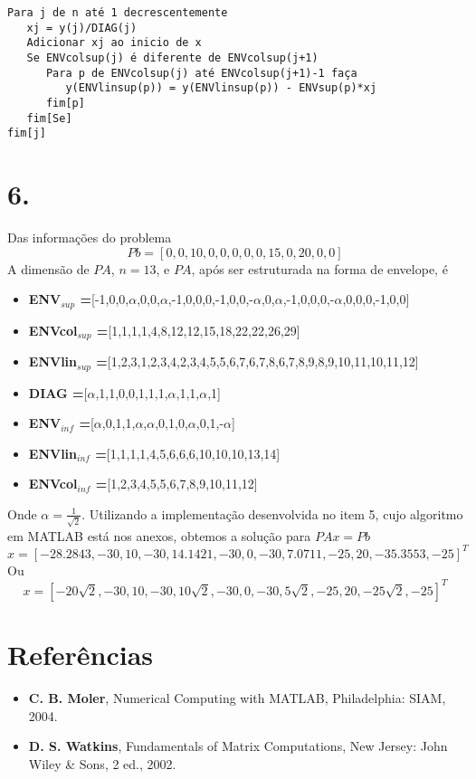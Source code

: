 \documentclass[a4paper, 12pt]{article}
\newcommand\litem[1]{\item{\bfseries #1}}
\begin{document}
\begin{verbatim}
Para j de n até 1 decrescentemente
   xj = y(j)/DIAG(j)
   Adicionar xj ao inicio de x
   Se ENVcolsup(j) é diferente de ENVcolsup(j+1)
      Para p de ENVcolsup(j) até ENVcolsup(j+1)-1 faça
         y(ENVlinsup(p)) = y(ENVlinsup(p)) - ENVsup(p)*xj
      fim[p]
   fim[Se]
fim[j]
\end{verbatim}

\section{6.}
Das informações do problema
\[
Pb =[0,0,10,0,0,0,0,0,15,0,20,0,0]
\]
A dimensão de $PA$, $n=13$, e $PA$, após ser estruturada na forma de envelope, é
\begin{itemize}[label=\textbullet]
\litem{ENV$_{sup}$ =}[-1,0,0,$\alpha$,0,0,$\alpha$,-1,0,0,0,-1,0,0,-$\alpha$,0,$\alpha$,-1,0,0,0,-$\alpha$,0,0,0,-1,0,0]
\litem{ENVcol$_{sup}$ =}[1,1,1,1,4,8,12,12,15,18,22,22,26,29]
\litem{ENVlin$_{sup}$ =}[1,2,3,1,2,3,4,2,3,4,5,5,6,7,6,7,8,6,7,8,9,8,9,10,11,10,11,12]
\litem{DIAG =}[$\alpha$,1,1,0,0,1,1,1,$\alpha$,1,1,$\alpha$,1]
\litem{ENV$_{inf}$ =}[$\alpha$,0,1,1,$\alpha$,$\alpha$,0,1,0,$\alpha$,0,1,-$\alpha$]
\litem{ENVlin$_{inf}$ =}[1,1,1,1,4,5,6,6,6,10,10,10,13,14]
\litem{ENVcol$_{inf}$ =}[1,2,3,4,5,5,6,7,8,9,10,11,12]
\end{itemize}

Onde $\alpha=\frac{1}{\sqrt{2}}$. Utilizando a implementação desenvolvida no item 5, cujo algoritmo em MATLAB está nos anexos, obtemos a solução para $PAx=Pb$
\[
x=[-28.2843, -30, 10, -30, 14.1421, -30, 0, -30, 7.0711, -25, 20, -35.3553, -25]^T
\]
Ou
\[
x = [-20\sqrt{2}, -30, 10, -30, 10\sqrt{2}, -30, 0, -30, 5\sqrt{2}, -25, 20, -25\sqrt{2}, -25]^T
\]

\section{Referências}

\begin{itemize}[label=\textbullet]
\litem{C. B. Moler}, Numerical Computing with MATLAB, Philadelphia: SIAM, 2004.
\litem{D. S. Watkins}, Fundamentals of Matrix Computations, New Jersey: John Wiley \& Sons, 2 ed., 2002.
\end{itemize}
\end{document}
